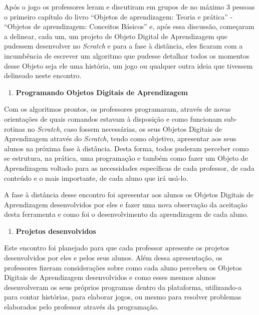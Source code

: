 \documentclass[12pt, openright, a4paper, brazil, english, french, spanish, bibjustif, openany, oneside]{abntex2}
\begin{document}
Após o jogo os professores leram e discutiram em grupos de no máximo 3 pessoas o primeiro capítulo do livro ``Objetos de aprendizagem: Teoria e prática'' - ``Objetos de aprendizagem: Conceitos Básicos'' \cite{tarouco} e, após essa discussão, começaram a delinear, cada um, um projeto de Objeto Digital de Aprendizagem que pudessem desenvolver no \textit{Scratch} e para a fase à distância, eles ficaram com a incumbência de escrever um algoritmo que pudesse detalhar todos os momentos desse Objeto seja ele uma história, um jogo ou qualquer outra ideia que tivessem delineado neste encontro.

\begin{enumerate}[resume,label=\textbf{\arabic*.}]

\item \textbf{Programando Objetos Digitais de Aprendizagem}

\end{enumerate}

Com os algoritmos prontos, os professores programaram, através de novas orientações de quais comandos estavam à disposição e como funcionam sub-rotinas no \textit{Scratch}, caso fossem necessárias, os seus Objetos Digitais de Aprendizagem através do \textit{Scratch}, tendo como objetivo, apresentar aos seus alunos na próxima fase à distância. Desta forma, todos puderam perceber como se estrutura, na prática, uma programação e também como fazer um Objeto de Aprendizagem voltado para as necessidades específicas de cada professor, de cada conteúdo e o mais importante, de cada aluno que irá usá-lo.

A fase à distância desse encontro foi apresentar aos alunos os Objetos Digitais de Aprendizagem desenvolvidos por eles e fazer uma nova observação da aceitação desta ferramenta e como foi o desenvolvimento da aprendizagem de cada aluno.

\begin{enumerate}[resume,label=\textbf{\arabic*.}]

\item \textbf{Projetos desenvolvidos}

\end{enumerate}

Este encontro foi planejado para que cada professor apresente os projetos desenvolvidos por eles e pelos seus alunos. Além dessa apresentação, os professores fizeram considerações sobre como cada aluno percebeu os Objetos Digitais de Aprendizagem desenvolvidos e como esses mesmos alunos desenvolveram os seus próprios programas dentro da plataforma, utilizando-a para contar histórias, para elaborar jogos, ou mesmo para resolver problemas elaborados pelo professor através da programação.
\end{document}
